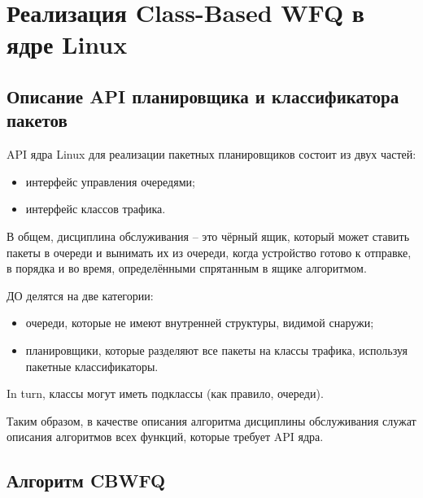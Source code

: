 \section{Реализация Class-Based WFQ в ядре Linux}

	\subsection{Описание API планировщика и классификатора пакетов}

	
        API ядра Linux для реализации пакетных планировщиков состоит из двух частей:
		\begin{itemize}
            \item интерфейс управления очередями;
            \item интерфейс классов трафика.
		\end{itemize}


        В общем, дисциплина обслуживания -- это чёрный ящик, который может ставить пакеты в очереди и вынимать их из очереди, когда устройство готово к отправке, в порядка и во время, определёнными спрятанным в ящике алгоритмом.

        ДО делятся на две категории:
		\begin{itemize}
            \item очереди, которые не имеют внутренней структуры, видимой снаружи;
            \item планировщики, которые разделяют все пакеты на классы трафика, используя пакетные классификаторы.
		\end{itemize}

        In turn, классы могут иметь подклассы (как правило, очереди). 



	Таким образом, в качестве описания алгоритма дисциплины обслуживания служат описания
	алгоритмов всех функций, которые требует API ядра.

	\subsection{Алгоритм CBWFQ}
	


